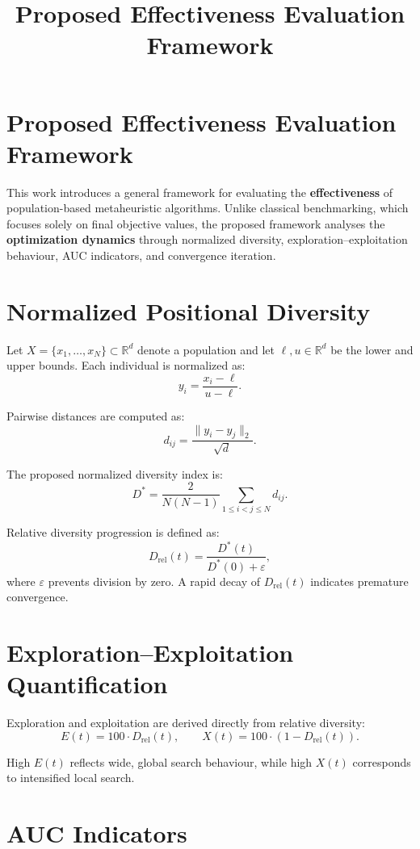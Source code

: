\documentclass[12pt]{article}
\title{Proposed Effectiveness Evaluation Framework}
\author{}
\date{}
\begin{document}
\maketitle

\section{Proposed Effectiveness Evaluation Framework}

This work introduces a general framework for evaluating the \textbf{effectiveness}
of population-based metaheuristic algorithms.  
Unlike classical benchmarking, which focuses solely on final objective values,
the proposed framework analyses the \textbf{optimization dynamics}
through normalized diversity, exploration--exploitation behaviour,
AUC indicators, and convergence iteration.

\section{Normalized Positional Diversity}

Let $X=\{x_1,\dots,x_N\}\subset \mathbb{R}^d$ denote a population
and let $\ell, u \in \mathbb{R}^d$ be the lower and upper bounds.  
Each individual is normalized as:
\[
y_i = \frac{x_i - \ell}{u - \ell}.
\]

Pairwise distances are computed as:
\[
d_{ij} = \frac{\|y_i - y_j\|_2}{\sqrt{d}}.
\]

The proposed normalized diversity index is:
\[
D^{*} = 
\frac{2}{N(N-1)} 
\sum_{1 \le i < j \le N} d_{ij}.
\]

Relative diversity progression is defined as:
\[
D_{\text{rel}}(t)
= 
\frac{D^{*}(t)}{D^{*}(0) + \varepsilon},
\]
where $\varepsilon$ prevents division by zero.
A rapid decay of $D_{\text{rel}}(t)$ indicates premature convergence.

\section{Exploration--Exploitation Quantification}

Exploration and exploitation are derived directly from relative diversity:
\[
E(t) = 100 \cdot D_{\text{rel}}(t), 
\qquad 
X(t) = 100 \cdot (1 - D_{\text{rel}}(t)).
\]

High $E(t)$ reflects wide, global search behaviour,
while high $X(t)$ corresponds to intensified local search.

\section{AUC Indicators}
\end{document}
